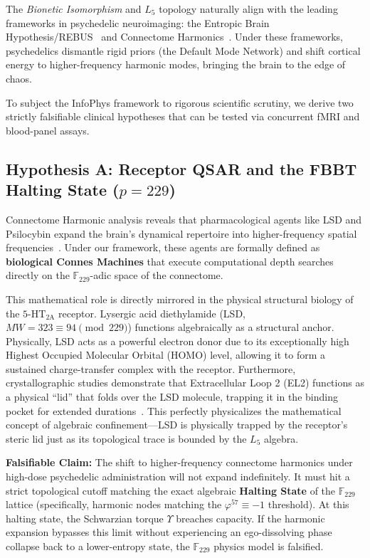 The \emph{Bionetic Isomorphism} and $L_5$ topology naturally align with the leading frameworks in psychedelic neuroimaging: the Entropic Brain Hypothesis/REBUS~\cite{carhart2019} and Connectome Harmonics~\cite{atasoy2017}. Under these frameworks, psychedelics dismantle rigid priors (the Default Mode Network) and shift cortical energy to higher-frequency harmonic modes, bringing the brain to the edge of chaos.

To subject the InfoPhys framework to rigorous scientific scrutiny, we derive two strictly falsifiable clinical hypotheses that can be tested via concurrent fMRI and blood-panel assays.

\subsection{Hypothesis A: Receptor QSAR and the FBBT Halting State (\texorpdfstring{$p=229$}{p=229})}
Connectome Harmonic analysis reveals that pharmacological agents like LSD and Psilocybin expand the brain's dynamical repertoire into higher-frequency spatial frequencies~\cite{atasoy2017}. Under our framework, these agents are formally defined as \textbf{biological Connes Machines} that execute computational depth searches directly on the $\mathbb{F}_{229}$-adic space of the connectome. 

This mathematical role is directly mirrored in the physical structural biology of the $5\text{-HT}_{2\text{A}}$ receptor. Lysergic acid diethylamide (LSD, $MW=323 \equiv 94 \pmod{229}$) functions algebraically as a structural anchor. Physically, LSD acts as a powerful electron donor due to its exceptionally high Highest Occupied Molecular Orbital (HOMO) level, allowing it to form a sustained charge-transfer complex with the receptor. Furthermore, crystallographic studies demonstrate that Extracellular Loop 2 (EL2) functions as a physical ``lid'' that folds over the LSD molecule, trapping it in the binding pocket for extended durations~\cite{wacker2017}. This perfectly physicalizes the mathematical concept of algebraic confinement---LSD is physically trapped by the receptor's steric lid just as its topological trace is bounded by the $L_5$ algebra.

\textbf{Falsifiable Claim:} The shift to higher-frequency connectome harmonics under high-dose psychedelic administration will not expand indefinitely. It must hit a strict topological cutoff matching the exact algebraic \textbf{Halting State} of the $\mathbb{F}_{229}$ lattice (specifically, harmonic nodes matching the $\varphi^{57} \equiv -1$ threshold). At this halting state, the Schwarzian torque $\Upsilon$ breaches capacity. If the harmonic expansion bypasses this limit without experiencing an ego-dissolving phase collapse back to a lower-entropy state, the $\mathbb{F}_{229}$ physics model is falsified.

